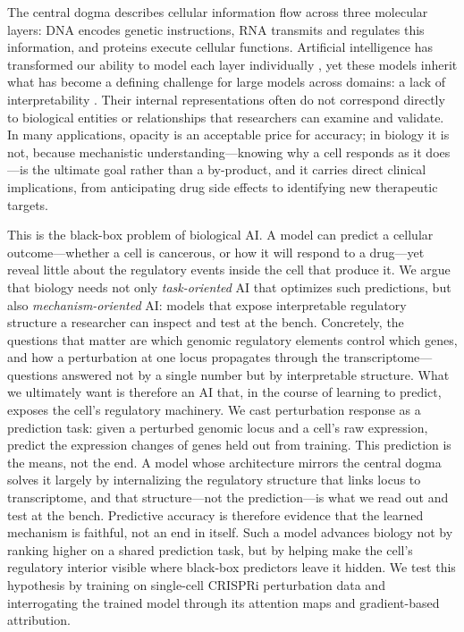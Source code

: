 \documentclass[12pt,a4paper]{article}
\begin{document}
The central dogma \citep{crick1970} describes cellular information flow across three molecular layers: DNA encodes genetic instructions, RNA transmits and regulates this information, and proteins execute cellular functions. Artificial intelligence has transformed our ability to model each layer individually \citep{jumper2021,avsec2021enformer,cui2024,theodoris2023}, yet these models inherit what has become a defining challenge for large models across domains: a lack of interpretability \citep{novakovsky2023,eraslan2019}. Their internal representations often do not correspond directly to biological entities or relationships that researchers can examine and validate. In many applications, opacity is an acceptable price for accuracy; in biology it is not, because mechanistic understanding---knowing why a cell responds as it does---is the ultimate goal rather than a by-product, and it carries direct clinical implications, from anticipating drug side effects to identifying new therapeutic targets.

This is the black-box problem of biological AI. A model can predict a cellular outcome---whether a cell is cancerous, or how it will respond to a drug---yet reveal little about the regulatory events inside the cell that produce it. We argue that biology needs not only \textit{task-oriented} AI that optimizes such predictions, but also \textit{mechanism-oriented} AI: models that expose interpretable regulatory structure a researcher can inspect and test at the bench. Concretely, the questions that matter are which genomic regulatory elements control which genes, and how a perturbation at one locus propagates through the transcriptome---questions answered not by a single number but by interpretable structure. What we ultimately want is therefore an AI that, in the course of learning to predict, exposes the cell's regulatory machinery. We cast perturbation response as a prediction task: given a perturbed genomic locus and a cell's raw expression, predict the expression changes of genes held out from training. This prediction is the means, not the end. A model whose architecture mirrors the central dogma solves it largely by internalizing the regulatory structure that links locus to transcriptome, and that structure---not the prediction---is what we read out and test at the bench. Predictive accuracy is therefore evidence that the learned mechanism is faithful, not an end in itself. Such a model advances biology not by ranking higher on a shared prediction task, but by helping make the cell's regulatory interior visible where black-box predictors leave it hidden. We test this hypothesis by training on single-cell CRISPRi perturbation data and interrogating the trained model through its attention maps and gradient-based attribution.
\end{document}
